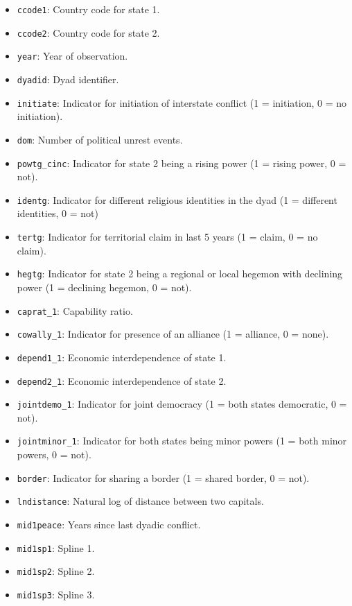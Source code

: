 \documentclass[12pt]{article}
\begin{document}
\begin{itemize}
  \item \texttt{ccode1}: Country code for state 1.
  \item \texttt{ccode2}: Country code for state 2. 
  \item \texttt{year}: Year of observation.
  \item \texttt{dyadid}: Dyad identifier.
  \item \texttt{initiate}: Indicator for initiation of interstate conflict (1 = initiation, 0 = no initiation).
  \item \texttt{dom}: Number of political unrest events.
  \item \texttt{powtg\_cinc}: Indicator for state 2 being a rising power (1 = rising power, 0 = not).
  \item \texttt{identg}: Indicator for different religious identities in the dyad (1 = different identities, 0 = not)
  \item \texttt{tertg}: Indicator for territorial claim in last 5 years (1 = claim, 0 = no claim).
  \item \texttt{hegtg}: Indicator for state 2 being a regional or local hegemon with declining power (1 = declining hegemon, 0 = not).
  \item \texttt{caprat\_1}: Capability ratio.
  \item \texttt{cowally\_1}: Indicator for presence of an alliance (1 = alliance, 0 = none).
  \item \texttt{depend1\_1}: Economic interdependence of state 1.
  \item \texttt{depend2\_1}: Economic interdependence of state 2.
  \item \texttt{jointdemo\_1}: Indicator for joint democracy (1 = both states democratic, 0 = not).
  \item \texttt{jointminor\_1}: Indicator for both states being minor powers (1 = both minor powers, 0 = not).
  \item \texttt{border}: Indicator for sharing a border (1 = shared border, 0 = not).
  \item \texttt{lndistance}: Natural log of distance between two capitals.
  \item \texttt{mid1peace}: Years since last dyadic conflict.
  \item \texttt{mid1sp1}: Spline 1.
  \item \texttt{mid1sp2}: Spline 2.
  \item \texttt{mid1sp3}: Spline 3.
\end{itemize}
\end{document}
